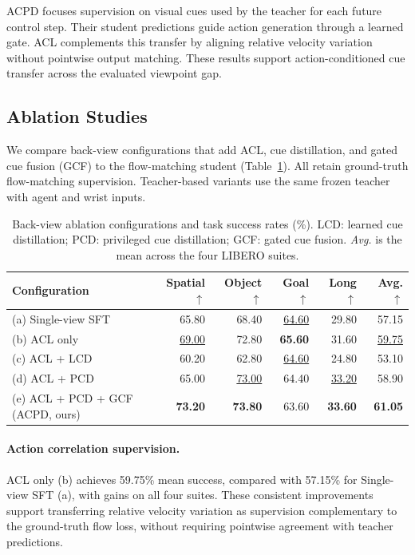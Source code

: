 \documentclass{ELSP}
\begin{document}
ACPD focuses supervision on visual cues used by the teacher
for each future control step. Their student predictions guide
action generation through a learned gate.
ACL complements this transfer by aligning relative velocity
variation without pointwise output matching.
These results support action-conditioned cue transfer across
the evaluated viewpoint gap.

\FloatBarrier
\subsection{Ablation Studies}
\label{sec:ablations}

We compare back-view configurations that add ACL, cue
distillation, and gated cue fusion (GCF) to the flow-matching
student (Table~\ref{tab:controlled_ablations}).
All retain ground-truth flow-matching supervision.
Teacher-based variants use the same frozen teacher with
agent and wrist inputs.

\begin{table}[!htbp]
\centering
\caption{Back-view ablation configurations and task success
rates (\%). LCD: learned cue distillation; PCD: privileged cue
distillation; GCF: gated cue fusion. \textit{Avg.} is the mean
across the four LIBERO suites.}
\label{tab:controlled_ablations}
\begin{tabular*}{0.95\columnwidth}{@{\extracolsep{\fill}}lrrrrr@{}}
\toprule
Configuration & Spatial $\uparrow$ & Object $\uparrow$
& Goal $\uparrow$ & Long $\uparrow$ & Avg. $\uparrow$ \\
\midrule
(a) Single-view SFT & 65.80 & 68.40
& \underline{64.60} & 29.80 & 57.15 \\
(b) ACL only & \underline{69.00} & 72.80
& \textbf{65.60} & 31.60 & \underline{59.75} \\
(c) ACL + LCD & 60.20 & 62.80
& \underline{64.60} & 24.80 & 53.10 \\
(d) ACL + PCD & 65.00 & \underline{73.00}
& 64.40 & \underline{33.20} & 58.90 \\
(e) ACL + PCD + GCF (ACPD, ours)
& \textbf{73.20} & \textbf{73.80} & 63.60
& \textbf{33.60} & \textbf{61.05} \\
\bottomrule
\end{tabular*}
\end{table}

\paragraph{Action correlation supervision.}
ACL only (b) achieves 59.75\% mean success, compared with
57.15\% for Single-view SFT (a), with gains on all four suites.
These consistent improvements support transferring relative
velocity variation as supervision complementary to the
ground-truth flow loss, without requiring pointwise agreement
with teacher predictions.
\end{document}
